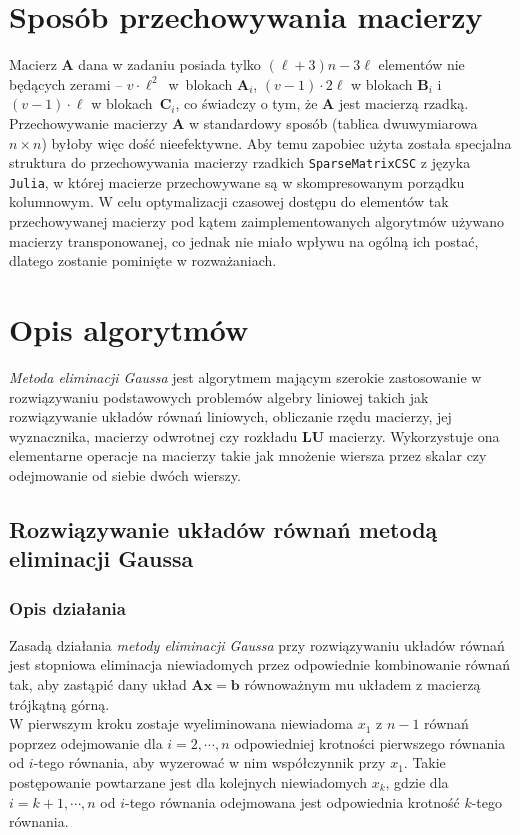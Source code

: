 \documentclass{mk-polish-lab-report}
\newcommand{\mA}{\bm{A}}
\newcommand{\mB}{\bm{B}}
\newcommand{\mC}{\bm{C}}
\newcommand{\mL}{\bm{L}}
\newcommand{\mU}{\bm{U}}
\newcommand{\vb}{\bm{b}}
\newcommand{\vx}{\bm{x}}
\begin{document}
\section{Sposób przechowywania macierzy}
Macierz $\mA$ dana w zadaniu posiada tylko $(\ell + 3)n - 3 \ell$ elementów nie będących zerami -- $v \cdot \ell^2$~w~blokach $\mA_i$, $(v-1) \cdot 2\ell$ w blokach $\mB_i$ i $(v-1) \cdot\ell$ w blokach~$\mC_i$, co świadczy o tym, że $\mA$ jest macierzą rzadką. Przechowywanie macierzy $\mA$ w standardowy sposób (tablica dwuwymiarowa $n\times n$) byłoby więc dość nieefektywne. Aby temu zapobiec użyta została specjalna struktura do przechowywania macierzy rzadkich \texttt{SparseMatrixCSC} z języka \texttt{Julia}, w której macierze przechowywane są w skompresowanym porządku kolumnowym. W celu optymalizacji czasowej dostępu do elementów tak przechowywanej macierzy pod kątem zaimplementowanych algorytmów używano macierzy transponowanej, co jednak nie miało wpływu na ogólną ich postać, dlatego zostanie pominięte w rozważaniach.

\section{Opis algorytmów}
\emph{Metoda eliminacji Gaussa} jest algorytmem mającym szerokie zastosowanie w rozwiązywaniu podstawowych problemów algebry liniowej takich jak rozwiązywanie układów równań liniowych, obliczanie rzędu macierzy, jej wyznacznika, macierzy odwrotnej czy rozkładu $\mL\mU$ macierzy. Wykorzystuje ona elementarne operacje na macierzy takie jak mnożenie wiersza przez skalar czy odejmowanie od siebie dwóch wierszy.

\subsection{Rozwiązywanie układów równań metodą eliminacji Gaussa} 

\subsubsection{Opis działania}

Zasadą działania \emph{metody eliminacji Gaussa} przy rozwiązywaniu układów równań jest stopniowa eliminacja niewiadomych przez odpowiednie kombinowanie równań tak, aby zastąpić dany układ $\mA\vx = \vb$ równoważnym mu układem z macierzą trójkątną górną. \\
\noindent W pierwszym kroku zostaje wyeliminowana niewiadoma $x_{1}$ z $n-1$ równań poprzez odejmowanie dla $i = 2, \cdots, n$ odpowiedniej krotności pierwszego równania od $i$-tego równania, aby wyzerować w nim współczynnik przy $x_{1}$. Takie postępowanie powtarzane jest dla kolejnych niewiadomych $x_{k}$, gdzie dla $i = k+1, \cdots, n$ od $i$-tego równania odejmowana jest odpowiednia krotność $k$-tego równania. \\
\end{document}
